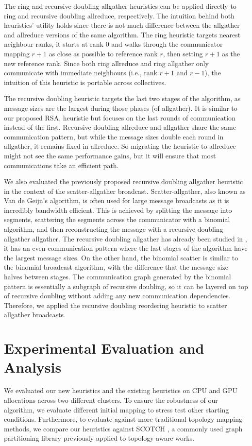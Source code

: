 The ring and recursive doubling allgather heuristics can be applied directly to ring and recursive doubling allreduce, respectively. 
The intuition behind both heuristics' utility holds since there is not much difference between the allgather and allreduce versions of the same algorithm.
The ring heuristic targets nearest neighbour ranks, it starts at rank 0 and walks through the communicator mapping $r+1$ as close as possible to reference rank $r$, then setting $r+1$ as the new reference rank.
Since both ring allreduce and ring allgather only communicate with immediate neighbours (i.e., rank $r+1$ and $r-1$), the intuition of this heuristic is portable across collectives.

The recursive doubling heuristic targets the last two stages of the algorithm, as message sizes are the largest during those phases (of allgather). 
It is similar to our proposed \gls{RSA}, heuristic but focuses on the last rounds of communication instead of the first. 
Recursive doubling allreduce and allgather share the same communication pattern, but while the message sizes double each round in allgather, it remains fixed in allreduce.
So migrating the heuristic to allreduce might not see the same performance gains, but it will ensure that most communications take an efficient path.

We also evaluated the previously proposed recursive doubling allgather heuristic in the context of the scatter-allgather broadcast.
Scatter-allgather, also known as Van de Geijn's algorithm, is often used for large message broadcasts as it is incredibly bandwidth efficient. 
This is achieved by splitting the message into segments, scattering the segments across the communicator with a binomial algorithm, and then reconstructing the message with a recursive doubling allgather allgather.
The recursive doubling allgather has already been studied in \cite{Mirsadeghi2016TopoAwareCollRR}, it has an even communication pattern where the last stages of the algorithm have the largest message sizes.
On the other hand, the binomial scatter is similar to the binomial broadcast algorithm, with the difference that the message size halves between stages. 
The communication graph generated by the binomial pattern is essentially a subgraph of recursive doubling, so it can be layered on top of recursive doubling without adding any new communication dependencies. 
Therefore, we applied the recursive doubling reordering heuristic to scatter allgather broadcasts.

\section{Experimental Evaluation and Analysis}
We evaluated our new heuristics and the existing heuristics on \gls{CPU} and \gls{GPU} allocations across two different clusters.
To ensure the robustness of our algorithm, we evaluate different initial mapping to stress test other starting conditions.
Furthermore, to evaluate against more traditional topology mapping methods, we compare our heuristics against SCOTCH \cite{Pellegrini2012SCOTCH}, a commonly used graph partitioning library previously applied to topology-aware works.

